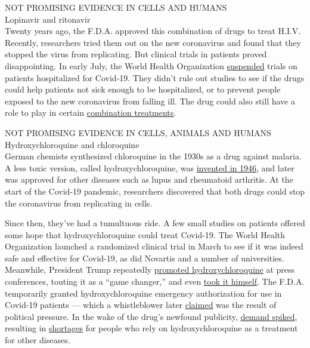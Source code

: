 NOT PROMISING EVIDENCE IN CELLS AND HUMANS\\
Lopinavir and ritonavir\\
Twenty years ago, the F.D.A. approved this combination of drugs to treat
H.I.V. Recently, researchers tried them out on the new coronavirus and
found that they stopped the virus from replicating. But clinical trials
in patients proved disappointing. In early July, the World Health
Organization
\href{https://www.who.int/news-room/detail/04-07-2020-who-discontinues-hydroxychloroquine-and-lopinavir-ritonavir-treatment-arms-for-covid-19}{suspended}
trials on patients hospitalized for Covid-19. They didn't rule out
studies to see if the drugs could help patients not sick enough to be
hospitalized, or to prevent people exposed to the new coronavirus from
falling ill. The drug could also still have a role to play in certain
\href{https://www.thelancet.com/journals/lancet/article/PIIS0140-6736(20)31042-4/fulltext}{combination
treatments}.

NOT PROMISING EVIDENCE IN CELLS, ANIMALS AND HUMANS\\
Hydroxychloroquine and chloroquine\\
German chemists synthesized chloroquine in the 1930s as a drug against
malaria. A less toxic version, called hydroxychloroquine, was
\href{https://www.nature.com/articles/s41421-020-0156-0\#:~:text=Hydroxychloroquine\%20(HCQ)\%20sulfate\%2C\%20a,than\%20CQ\%20in\%20animals4.}{invented
in 1946}, and later was approved for other diseases such as lupus and
rheumatoid arthritis. At the start of the Covid-19 pandemic, researchers
discovered that both drugs could stop the coronavirus from replicating
in cells.

Since then, they've had a tumultuous ride. A few small studies on
patients offered some hope that hydroxychloroquine could treat Covid-19.
The World Health Organization launched a randomized clinical trial in
March to see if it was indeed safe and effective for Covid-19, as did
Novartis and a number of universities. Meanwhile, President Trump
repeatedly
\href{https://www.nytimes3xbfgragh.onion/2020/04/06/us/politics/coronavirus-trump-malaria-drug.html}{promoted
hydroxychloroquine} at press conferences, touting it as a ``game
changer,'' and even
\href{https://www.nytimes3xbfgragh.onion/2020/05/18/us/politics/trump-hydroxychloroquine-covid-coronavirus.html}{took
it himself}. The F.D.A. temporarily granted hydroxychloroquine emergency
authorization for use in Covid-19 patients --- which a whistleblower
later
\href{https://www.buzzfeednews.com/article/zahrahirji/fda-eua-hydroxychloroquine-chloroquine}{claimed}
was the result of political pressure. In the wake of the drug's newfound
publicity,
\href{https://www.nytimes3xbfgragh.onion/2020/09/03/world/covid-coronavirus.html?searchResultPosition=2\#link-33c05fc5}{demand
spiked}, resulting in
\href{https://ard.bmj.com/content/early/2020/07/01/annrheumdis-2020-218164}{shortages}
for people who rely on hydroxychloroquine as a treatment for other
diseases.

